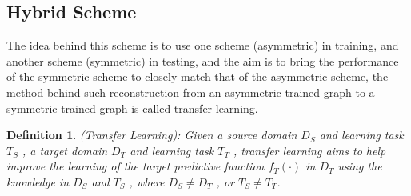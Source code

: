\documentclass[a4paper, 12pt]{report}
\newtheorem{definition}{Definition}
\begin{document}
\subsection{\textbf{Hybrid Scheme}}
The idea behind this scheme is to use one scheme (asymmetric) in training, and another scheme (symmetric) in testing, and the aim is to bring the performance of the symmetric scheme to closely match that of the asymmetric scheme, the method behind such reconstruction from an asymmetric-trained graph to a symmetric-trained graph is called transfer learning.
\begin{definition}\label{definition:\thedefinition}
	(Transfer Learning): Given a source domain $ D_{S} $
	and learning task $ T_{S} $ , a target domain $ D_{T} $ and learning task
	$ T_{T} $ , transfer learning aims to help improve the learning of the
	target predictive function $ f_{T}(\cdot) $ in $ D_{T} $ using the knowledge in
	$ D_{S} $ and $ T_{S} $ , where $ D_{S} \neq D_{T} $ , or $ T_{S} \neq T_{T} $.~\citep{5288526}
\end{definition}
\end{document}
